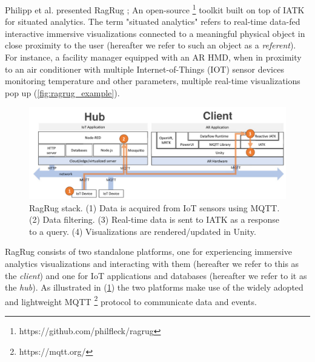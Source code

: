 \documentclass{vgtc}                          %
\begin{document}
Philipp et al. presented RagRug \cite{ragrug_toolkit}; An open-source
\footnote{https://github.com/philfleck/ragrug} toolkit built on top of IATK
for situated analytics. The term "situated analytics" refers to real-time
data-fed interactive immersive visualizations connected to a meaningful physical
object in close proximity to the user (hereafter we refer to such an object as
a \textit{referent}). For instance, a facility manager equipped with an AR HMD,
when in proximity to an air conditioner with multiple Internet-of-Things (IOT)
sensor devices monitoring temperature and other parameters, multiple real-time
visualizations pop up (\cref{fig:ragrug_example}).

\smallskip

\begin{figure}[tb]
	\centering
	\includegraphics[width=\columnwidth]{ragrug_stack}
	\caption[Caption for RagRug]{RagRug stack. (1) Data is acquired from IoT
		sensors using MQTT. (2) Data filtering. (3) Real-time data is sent to
		IATK as a response to a query. (4) Visualizations are
		rendered/updated in Unity.}
	\label{fig:ragrug_stack}
\end{figure}

\noindent RagRug consists of two standalone platforms, one for experiencing
immersive analytics visualizations and interacting with them (hereafter we
refer to this as the \textit{client}) and one for IoT applications and
databases (hereafter we refer to it as the \textit{hub}). As illustrated
in (\cref{fig:ragrug_stack}) the two platforms make use of the widely adopted
and lightweight MQTT \footnote{https://mqtt.org/} protocol to communicate
data and events.

\smallskip
\end{document}
